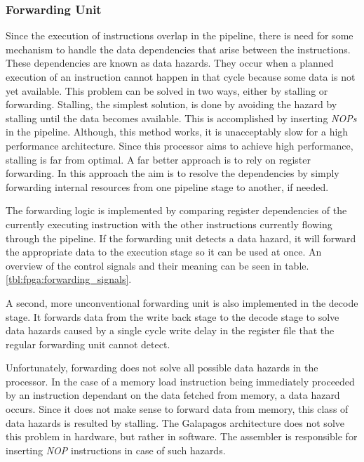 \newpage
\subsubsection{Forwarding Unit} \label{fpga:fitness:sss:forwarding_unit}
Since the execution of instructions overlap in the pipeline, there is need for some mechanism to handle the data dependencies that arise between the instructions.
These dependencies are known as data hazards.
They occur when a planned execution of an instruction cannot happen in that cycle because some data is not yet available.
This problem can be solved in two ways, either by stalling or forwarding.
Stalling, the simplest solution, is done by avoiding the hazard by stalling until the data becomes available.
This is accomplished by inserting \emph{NOPs} in the pipeline.
Although, this method works, it is unacceptably slow for a high performance architecture.
Since this processor aims to achieve high performance, stalling is far from optimal.
A far better approach is to rely on register forwarding.
In this approach the aim is to resolve the dependencies by simply forwarding internal resources from one pipeline stage to another, if needed.

The forwarding logic is implemented by comparing register dependencies of the currently executing instruction with the other instructions currently flowing through the pipeline.
If the forwarding unit detects a data hazard, it will forward the appropriate data to the execution stage so it can be used at once.
An overview of the control signals and their meaning can be seen in table. \ref{tbl:fpga:forwarding_signals}.

A second, more unconventional forwarding unit is also implemented in the decode stage.
It forwards data from the write back stage to the decode stage to solve data hazards caused by a single cycle write delay in the register file that the regular forwarding unit cannot detect.

Unfortunately, forwarding does not solve all possible data hazards in the processor.
In the case of a memory load instruction being immediately proceeded by an instruction dependant on the data fetched from memory, a data hazard occurs.
Since it does not make sense to forward data from memory, this class of data hazards is resulted by stalling.
The Galapagos architecture does not solve this problem in hardware, but rather in software.
The assembler is responsible for inserting \emph{NOP} instructions in case of such hazards.  



